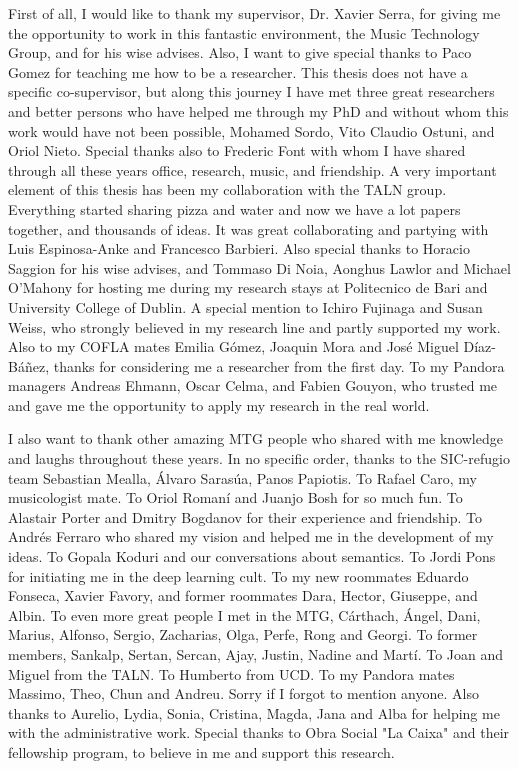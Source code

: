 First of all, I would like to thank my supervisor, Dr. Xavier Serra, for giving me the opportunity to work in this fantastic environment, the Music Technology Group, and for his wise advises. Also, I want to give special thanks to Paco Gomez for teaching me how to be a researcher. This thesis does not have a specific co-supervisor, but along this journey I have met three great researchers and better persons who have helped me through my PhD and without whom this work would have not been possible, Mohamed Sordo, Vito Claudio Ostuni, and Oriol Nieto. 
Special thanks also to Frederic Font with whom I have shared through all these years office, research, music, and friendship.
A very important element of this thesis has been my collaboration with the TALN group. Everything started sharing pizza and water and now we have a lot papers together, and thousands of ideas. It was great collaborating and partying with Luis Espinosa-Anke and Francesco Barbieri. Also special thanks to Horacio Saggion for his wise advises, and Tommaso Di Noia, Aonghus Lawlor and Michael O'Mahony for hosting me during my research stays at Politecnico de Bari and University College of Dublin. 
A special mention to Ichiro Fujinaga and Susan Weiss, who strongly believed in my research line and partly supported my work. Also to my COFLA mates Emilia Gómez, Joaquin Mora and José Miguel Díaz-Báñez, thanks for considering me a researcher from the first day.
To my Pandora managers Andreas Ehmann, Oscar Celma, and Fabien Gouyon, who trusted me and gave me the opportunity to apply my research in the real world.

I also want to thank other amazing MTG people who shared with me knowledge and laughs throughout these years. In no specific order, thanks to the SIC-refugio team
Sebastian Mealla, Álvaro Sarasúa, Panos Papiotis. To Rafael Caro, my musicologist mate. To Oriol Romaní and Juanjo Bosh for so much fun. To Alastair Porter and Dmitry Bogdanov for their experience and friendship. To Andrés Ferraro who shared my vision and helped me in the development of my ideas. To Gopala Koduri and our conversations about semantics. To Jordi Pons for initiating me in the deep learning cult. To my new roommates Eduardo Fonseca, Xavier Favory, and former roommates Dara, Hector, Giuseppe, and Albin. To even more great people I met in the MTG, Cárthach, Ángel, Dani, Marius, Alfonso, Sergio, Zacharias, Olga, Perfe, Rong and Georgi. To former members, Sankalp, Sertan, Sercan, Ajay, Justin, Nadine and Martí. To Joan and Miguel from the TALN. To Humberto from UCD. To my Pandora mates Massimo, Theo, Chun and Andreu. Sorry if I forgot to mention anyone.
Also thanks to Aurelio, Lydia, Sonia, Cristina, Magda, Jana and Alba for helping me with the administrative work.
Special thanks to Obra Social "La Caixa" and their fellowship program, to believe in me and support this research.

